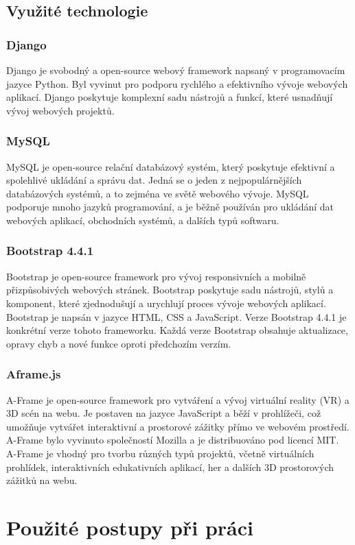 \documentclass[12pt, a4paper,
twoside,        %
openright
]{report}
\begin{document}
\section[Využité technologie]{Využité technologie}
	\subsection[Django]{Django} 
	Django je svobodný a open-source webový framework napsaný v programovacím jazyce Python. Byl vyvinut pro podporu rychlého a efektivního vývoje webových aplikací. Django poskytuje komplexní sadu nástrojů a funkcí, které usnadňují vývoj webových projektů.
	\subsection[MySQL]{MySQL}  
	MySQL je open-source relační databázový systém, který poskytuje efektivní a spolehlivé ukládání a správu dat. Jedná se o jeden z nejpopulárnějších databázových systémů, a to zejména ve světě webového vývoje. MySQL podporuje mnoho jazyků programování, a je běžně používán pro ukládání dat webových aplikací, obchodních systémů, a dalších typů softwaru.
	\newpage
	\subsection[Bootstrap 4.4.1]{Bootstrap 4.4.1} 
	Bootstrap je open-source framework pro vývoj responsivních a mobilně přizpůsobivých webových stránek. Bootstrap poskytuje sadu nástrojů, stylů a komponent, které zjednodušují a urychlují proces vývoje webových aplikací. Bootstrap je napsán v jazyce HTML, CSS a JavaScript. Verze Bootstrap 4.4.1 je konkrétní verze tohoto frameworku. Každá verze Bootstrap obsahuje aktualizace, opravy chyb a nové funkce oproti předchozím verzím.
	\subsection[Aframe.js]{Aframe.js}
	A-Frame je open-source framework pro vytváření a vývoj virtuální reality (VR) a 3D scén na webu. Je postaven na jazyce JavaScript a běží v prohlížeči, což umožňuje vytvářet interaktivní a prostorové zážitky přímo ve webovém prostředí. A-Frame bylo vyvinuto společností Mozilla a je distribuováno pod licencí MIT.
A-Frame je vhodný pro tvorbu různých typů projektů, včetně virtuálních prohlídek, interaktivních edukativních aplikací, her a dalších 3D prostorových zážitků na webu.
	\chapter{Použité postupy při práci}
\end{document}
